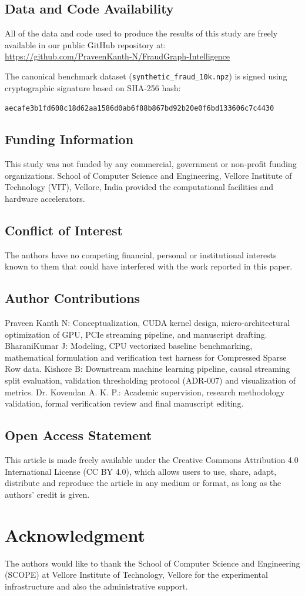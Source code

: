 \documentclass[journal]{IEEEtran}
\begin{document}
\subsection*{Data and Code Availability}
All of the data and code used to produce the results of this study are freely available in our public GitHub repository at:\\
\url{https://github.com/PraveenKanth-N/FraudGraph-Intelligence}

The canonical benchmark dataset (\texttt{synthetic\_fraud\_10k.npz}) is signed using cryptographic signature based on SHA-256 hash:
\begin{center}
\texttt{aecafe3b1fd608c18d62aa1586d0ab6f88b867bd92b20e0f6bd133606c7c4430}
\end{center}

\subsection*{Funding Information}
This study was not funded by any commercial, government or non-profit funding organizations. School of Computer Science and Engineering, Vellore Institute of Technology (VIT), Vellore, India provided the computational facilities and hardware accelerators.

\subsection*{Conflict of Interest}
The authors have no competing financial, personal or institutional interests known to them that could have interfered with the work reported in this paper.

\subsection*{Author Contributions}
Praveen Kanth N: Conceptualization, CUDA kernel design, micro-architectural optimization of GPU, PCIe streaming pipeline, and manuscript drafting. BharaniKumar J: Modeling, CPU vectorized baseline benchmarking, mathematical formulation and verification test harness for Compressed Sparse Row data. Kishore B: Downstream machine learning pipeline, causal streaming split evaluation, validation thresholding protocol (ADR-007) and visualization of metrics. Dr. Kovendan A. K. P.: Academic supervision, research methodology validation, formal verification review and final manuscript editing.

\subsection*{Open Access Statement}
This article is made freely available under the Creative Commons Attribution 4.0 International License (CC BY 4.0), which allows users to use, share, adapt, distribute and reproduce the article in any medium or format, as long as the authors' credit is given.

\section*{Acknowledgment}
The authors would like to thank the School of Computer Science and Engineering (SCOPE) at Vellore Institute of Technology, Vellore for the experimental infrastructure and also the administrative support.



\end{document}
